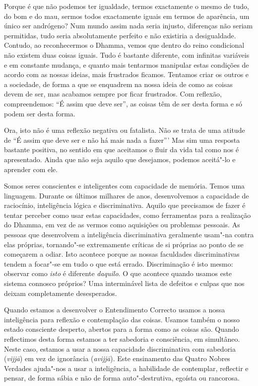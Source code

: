 Porque é que não podemos ter igualdade, termos exactamente o mesmo de tudo, do
bom e do mau, sermos todos exactamente iguais em termos de aparência, um único
ser andrógeno? Num mundo assim nada seria injusto, diferenças não seriam
permitidas, tudo seria absolutamente perfeito e não existiria a desigualdade.
Contudo, ao reconhecermos o Dhamma, vemos que dentro do reino condicional não
existem duas coisas iguais. Tudo é bastante diferente, com infinitas variáveis e
em constante mudança, e quanto mais tentarmos manipular estas condições de
acordo com as nossas ideias, mais frustrados ficamos. Tentamos criar os outros e
a sociedade, de forma a que se enquadrem na nossa ideia de como as coisas devem
de ser, mas acabamos sempre por ficar frustrados. Com reflexão, compreendemos:
“É assim que deve ser”, as coisas têm de ser desta forma e só podem ser desta
forma.

Ora, isto não é uma reflexão negativa ou fatalista. Não se trata de uma atitude
de “É assim que deve ser e não há mais nada a fazer”' Mas sim uma resposta
bastante positiva, no sentido em que aceitamos o fluir da vida tal como nos é
apresentado. Ainda que não seja aquilo que desejamos, podemos aceitá"-lo e
aprender com ele.

\sectionBreak

Somos seres conscientes e inteligentes com capacidade de memória. Temos uma
linguagem. Durante os últimos milhares de anos, desenvolvemos a capacidade de
raciocínio, inteligência lógica e discriminativa. Aquilo que precisamos de fazer
é tentar perceber como usar estas capacidades, como ferramentas para a
realização do Dhamma, em vez de as vermos como aquisições ou problemas pessoais.
As pessoas que desenvolvem a inteligência discriminativa geralmente usam"-na
contra elas próprias, tornando"-se extremamente críticas de si próprias ao ponto
de se começarem a odiar. Isto acontece porque as nossas faculdades
discriminativas tendem a focar"-se em tudo o que está errado. Discriminação é
isto mesmo: observar como \emph{isto} é diferente \emph{daquilo}. O que acontece
quando usamos este sistema connosco próprios? Uma interminável lista de defeitos
e culpas que nos deixam completamente desesperados.

Quando estamos a desenvolver o Entendimento Correcto usamos a nossa inteligência
para reflexão e contemplação das coisas. Usamos também o nosso estado consciente desperto,
abertos para a forma como as coisas são. Quando reflectimos desta forma
estamos a ter sabedoria e consciência, em simultâneo. Neste caso, estamos a
usar a nossa capacidade discriminativa com sabedoria (\emph{vijjā}) em vez de
ignorância (\emph{avijjā}). Este ensinamento das Quatro Nobres Verdades ajuda"-nos 
a usar a inteligência, a habilidade de contemplar, reflectir e
pensar, de forma sábia e não de forma auto"-destrutiva, egoísta ou rancorosa.

